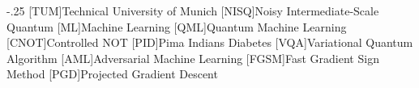 \documentclass[headsepline,footsepline,footinclude=false,oneside,fontsize=11pt,paper=a4,listof=totoc,bibliography=totoc]{scrbook} %
\begin{document}


\frontmatter{}





\tableofcontents{}

\mainmatter{}









%


\begin{acronym}
	\itemsep-.25\baselineskip{}
	[TUM]{Technical University of Munich}
	[NISQ]{Noisy Intermediate-Scale Quantum}
	[ML]{Machine Learning}
	[QML]{Quantum Machine Learning}
	[CNOT]{Controlled NOT}
	[PID]{Pima Indians Diabetes}
	[VQA]{Variational Quantum Algorithm}
	[AML]{Adversarial Machine Learning}
	[FGSM]{Fast Gradient Sign Method}
	[PGD]{Projected Gradient Descent}
\end{acronym}

\listoffigures{}
\listoftables{}
\printbibliography{}
\end{document}
